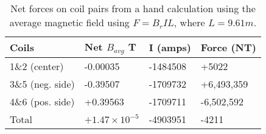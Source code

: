 \begin{table}
\centering
\begin{tabular}{llll}
\hline
Coils & Net $B_{avg}$ T & I (amps) & Force (NT) \\
\hline
1\&2 (center) & -0.00035 & -1484508 & +5022 \\
3\&5 (neg. side) & -0.39507 & -1709732 & +6,493,359 \\
4\&6 (pos. side) & +0.39563 & -1709711 & -6,502,592 \\
Total & $+1.47\times10^{-5}$ & -4903951 & -4211 \\
\hline
\end{tabular}
\caption{Net forces on coil pairs from a hand calculation using the average magnetic field using $F=B_{r}IL$, where $L=9.61m$.}
\label{tab:hand_forces}
\end{table}
